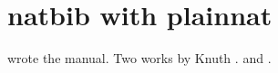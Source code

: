 \documentclass{article}
\begin{document}
\section*{natbib with plainnat}
\citet{lamport} wrote the manual.
Two works by Knuth \citep[p.~5]{knuth,literate}.
\citealt{bibtex} and \citeauthor{lamport}.
\nocite{vonname}


\end{document}
